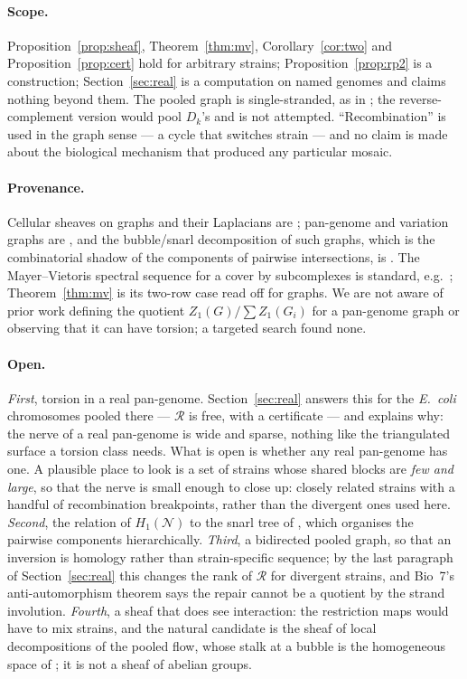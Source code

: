 \documentclass[11pt]{article}
\theoremstyle{plain}
\theoremstyle{definition}
\theoremstyle{remark}
\newcommand{\Rec}{\mathcal{R}}
\newcommand{\Nerve}{\mathcal{N}}
\begin{document}
\paragraph{Scope.} Proposition~\ref{prop:sheaf}, Theorem~\ref{thm:mv},
Corollary~\ref{cor:two} and Proposition~\ref{prop:cert} hold for arbitrary strains;
Proposition~\ref{prop:rp2} is a construction; Section~\ref{sec:real} is a computation on
named genomes and claims nothing beyond them.
The pooled graph is single-stranded, as in \cite{Bio9}; the reverse-complement
version would pool $D_k$'s and is not attempted. ``Recombination'' is used in the graph sense
--- a cycle that switches strain --- and no claim is made about the biological mechanism that
produced any particular mosaic.

\paragraph{Provenance.} Cellular sheaves on graphs and their Laplacians are \cite{HG19};
pan-genome and variation graphs are \cite{GSN18,EPN20}, and the bubble/snarl decomposition of
such graphs, which is the combinatorial shadow of the components of pairwise intersections,
is \cite{PNE18}. The Mayer--Vietoris spectral sequence for a cover by subcomplexes is
standard, e.g.\ \cite[VII.4]{Brown}; Theorem~\ref{thm:mv} is its two-row case read off for
graphs. We are not aware of prior work defining the quotient $Z_1(G)/\sum Z_1(G_i)$ for a
pan-genome graph or observing that it can have torsion; a targeted search found none.

\paragraph{Open.} \emph{First}, torsion in a real pan-genome. Section~\ref{sec:real} answers
this for the \emph{E.\ coli} chromosomes pooled there --- $\Rec$ is free, with a certificate
--- and explains why: the nerve of a real pan-genome is wide and sparse, nothing like the
triangulated surface a torsion class needs. What is open is whether any real pan-genome has
one. A plausible place to look is a set of strains whose shared blocks are \emph{few and
large}, so that the nerve is small enough to close up: closely related strains with a
handful of recombination breakpoints, rather than the divergent ones used here. \emph{Second},
the relation of $H_1(\Nerve)$ to the snarl tree of \cite{PNE18}, which organises the pairwise
components hierarchically. \emph{Third}, a bidirected pooled graph, so that an inversion is
homology rather than strain-specific sequence; by the last paragraph of Section~\ref{sec:real}
this changes the rank of $\Rec$ for divergent strains, and Bio~7's anti-automorphism theorem
says the repair cannot be a quotient by the strand involution. \emph{Fourth}, a sheaf that
does see interaction: the restriction maps would
have to mix strains, and the natural candidate is the sheaf of local decompositions of the
pooled flow, whose stalk at a bubble is the homogeneous space of \cite{Bio9}; it is not a
sheaf of abelian groups.
\end{document}
